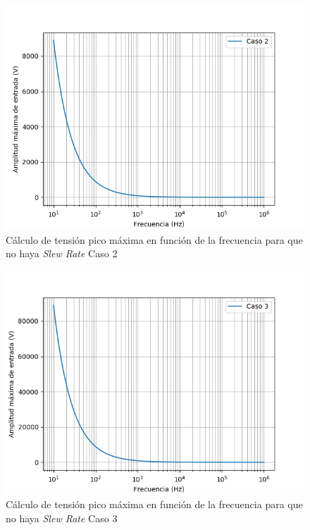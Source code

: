 \begin{figure}[H]
\begin{centering}
\includegraphics[scale=0.5]{../Ex1/iA/Resources1a/SlewRate2}
\par\end{centering}
\caption{Cálculo de tensión pico máxima en función de la frecuencia para que
no haya \emph{Slew Rate} Caso 2}
\label{1_a_15}

\end{figure}

\begin{figure}[H]
\begin{centering}
\includegraphics[scale=0.5]{../Ex1/iA/Resources1a/SlewRate3}
\par\end{centering}
\caption{Cálculo de tensión pico máxima en función de la frecuencia para que
no haya \emph{Slew Rate} Caso 3}
\label{1_a_16}

\end{figure}

